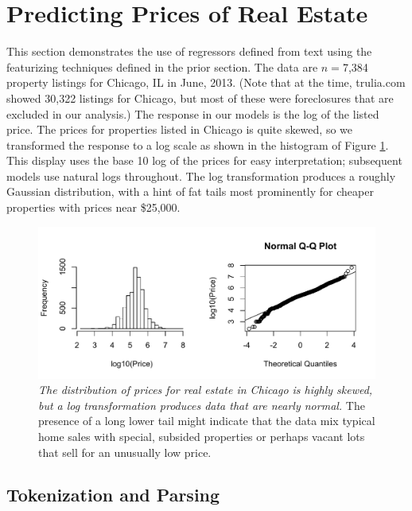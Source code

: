 \documentclass[12pt]{article}
\begin{document}
\section{Predicting Prices of Real Estate}

 This section demonstrates the use of regressors defined from text using the
 featurizing techniques defined in the prior section.  The data are $n=$7,384 property listings for Chicago, IL in June, 2013.   (Note that at the time, trulia.com showed  30,322 listings for Chicago, but most of these were foreclosures that are excluded in our analysis.) The response in our models is the log of the listed price.  The prices for properties listed in Chicago is quite skewed, so we transformed the response to a log scale as shown in the histogram of Figure \ref{fig:prices}.  This display uses the base 10 log of the prices for easy interpretation; subsequent models use natural logs throughout.  The log
 transformation produces a roughly Gaussian distribution, with a hint of fat
 tails most prominently for cheaper properties with prices near \$25,000.


 \begin{figure}
 \caption{ \label{fig:prices} { \sl The distribution of prices for real estate
 in Chicago is highly skewed, but a log transformation produces data that are
 nearly normal.} The presence of a long lower tail might indicate that the data
 mix typical home sales with special, subsided properties or perhaps vacant lots
 that sell for an unusually low price. }

 \centerline{
 \vspace{0.1in}
 \includegraphics[width=5in]{figures/prices} }
 \vspace{0.2in}
 \end{figure}


 \subsection{ Tokenization and Parsing }
\end{document}

